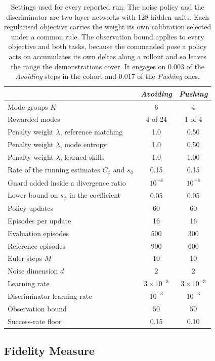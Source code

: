 \documentclass[preprint,12pt]{elsarticle}
\begin{document}
\begin{table}[t]
\caption{Settings used for every reported run. The noise policy and the
discriminator are two-layer networks with 128 hidden units. Each regularised
objective carries the weight its own calibration selected under a common rule.
The observation bound applies to every objective and both tasks, because the
commanded pose a policy acts on accumulates its own deltas along a rollout and
so leaves the range the demonstrations cover. It engages on $0.003$ of the
\emph{Avoiding} steps in the cohort and $0.017$ of the \emph{Pushing} ones.}
\label{tab:hyper}
\begin{tabular}{@{}lcc@{}}
\toprule
 & \emph{Avoiding} & \emph{Pushing} \\
\midrule
Mode groups $K$ & 6 & 4 \\
Rewarded modes & 4 of 24 & 1 of 4 \\
Penalty weight $\lambda$, reference matching & 1.0 & 0.50 \\
Penalty weight $\lambda$, mode entropy & 1.0 & 0.50 \\
Penalty weight $\lambda$, learned skills & 1.0 & 1.00 \\
Rate of the running estimates $C_\phi$ and $s_\phi$ & 0.15 & 0.15 \\
Guard added inside a divergence ratio & $10^{-8}$ & $10^{-8}$ \\
Lower bound on $s_\phi$ in the coefficient & 0.05 & 0.05 \\
Policy updates & 60 & 60 \\
Episodes per update & 16 & 16 \\
Evaluation episodes & 500 & 300 \\
Reference episodes & 900 & 600 \\
Euler steps $M$ & 10 & 10 \\
Noise dimension $d$ & 2 & 2 \\
Learning rate & $3\times10^{-3}$ & $3\times10^{-3}$ \\
Discriminator learning rate & $10^{-3}$ & $10^{-3}$ \\
Observation bound & 50 & 50 \\
Success-rate floor & 0.15 & 0.10 \\
\bottomrule
\end{tabular}
\end{table}

\subsection{Fidelity Measure}\label{sec:measure}
\end{document}
